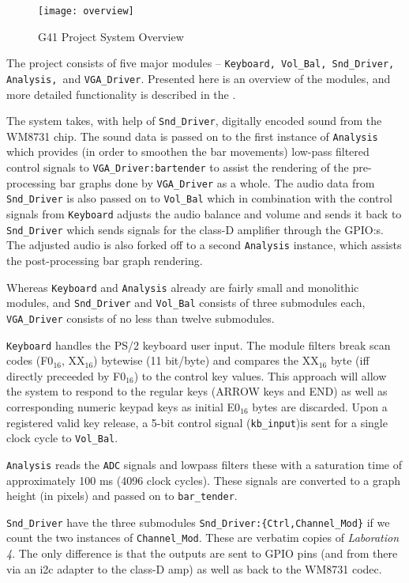 \begin{figure}[H]
  \centering
  \texttt{[image: overview]}
  \caption{G41 Project System Overview}
  \label{fig:overview}
\end{figure}

The project consists of five major modules -- \texttt{Keyboard, Vol\_Bal, Snd\_Driver, Analysis, }and \texttt{VGA\_Driver}. Presented here is an overview of the modules, and more detailed functionality is described in the \citeD.

The system takes, with help of \texttt{Snd\_Driver}, digitally encoded sound from the WM8731 chip. The sound data is passed on to the first instance of \texttt{Analysis} which provides (in order to smoothen the bar movements) low-pass filtered control signals to \texttt{VGA\_Driver:bartender} to assist the rendering of the pre-processing bar graphs done by \texttt{VGA\_Driver} as a whole. The audio data from \texttt{Snd\_Driver} is also passed on to \texttt{Vol\_Bal} which in combination with the control signals from \texttt{Keyboard} adjusts the audio balance %
and volume and sends it back to \texttt{Snd\_Driver} which sends signals for the class-D amplifier through the GPIO:s. The adjusted audio is also forked off to a second \texttt{Analysis} instance, which assists the post-processing bar graph rendering.

Whereas \texttt{Keyboard} and \texttt{Analysis} already are fairly small and monolithic modules, and \texttt{Snd\_Driver} and \texttt{Vol\_Bal} consists of three submodules each, \texttt{VGA\_Driver} consists of no less than twelve submodules.

\texttt{Keyboard} handles the PS/2 keyboard user input. The module filters break scan codes (F0$_{16}$, XX$_{16}$) bytewise (11 bit/byte) and compares the XX$_{16}$ byte (iff directly preceeded by F0$_{16}$) to the control key values. This approach will allow the system to respond to the regular keys (ARROW keys and END) as well as corresponding numeric keypad keys as initial E0$_{16}$ bytes are discarded. Upon a registered valid key release, a 5-bit control signal (\verb=kb_input=)is sent for a single clock cycle to \texttt{Vol\_Bal}.

\texttt{Analysis} reads the \verb=ADC= signals and lowpass filters these with a saturation time of approximately 100 ms (4096 clock cycles). These signals are converted to a graph height (in pixels) and passed on to \verb=bar_tender=.

\texttt{Snd\_Driver} have the three submodules \verb=Snd_Driver:{Ctrl,Channel_Mod}= if we count the two instances of \texttt{Channel\_Mod}. These are verbatim copies of \emph{Laboration 4}. The only difference is that the outputs are sent to GPIO pins (and from there via an i2c adapter to the class-D amp) as well as back to the WM8731 codec.

